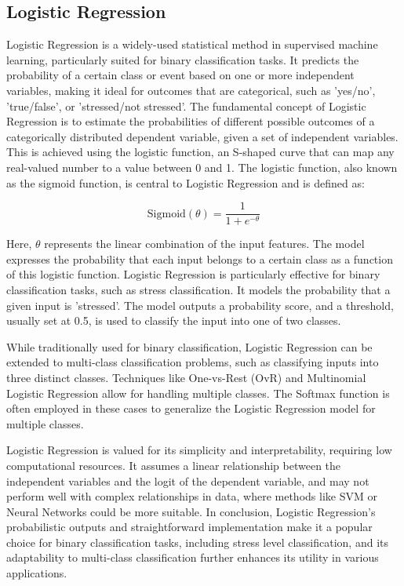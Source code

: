 \subsection*{Logistic Regression}

Logistic Regression is a widely-used statistical method in supervised machine learning, particularly suited for binary classification tasks. It predicts the probability of a certain class or event based on one or more independent variables, making it ideal for outcomes that are categorical, such as 'yes/no', 'true/false', or 'stressed/not stressed'. The fundamental concept of Logistic Regression is to estimate the probabilities of different possible outcomes of a categorically distributed dependent variable, given a set of independent variables. This is achieved using the logistic function, an S-shaped curve that can map any real-valued number to a value between 0 and 1. The logistic function, also known as the sigmoid function, is central to Logistic Regression and is defined as:

\begin{equation}
    \text{Sigmoid}(\theta) = \frac{1}{1 + e^{-\theta}}
\end{equation}

Here, \( \theta \) represents the linear combination of the input features. The model expresses the probability that each input belongs to a certain class as a function of this logistic function. Logistic Regression is particularly effective for binary classification tasks, such as stress classification. It models the probability that a given input is 'stressed'. The model outputs a probability score, and a threshold, usually set at 0.5, is used to classify the input into one of two classes. 

While traditionally used for binary classification, Logistic Regression can be extended to multi-class classification problems, such as classifying inputs into three distinct classes. Techniques like One-vs-Rest (OvR) and Multinomial Logistic Regression allow for handling multiple classes. The Softmax function is often employed in these cases to generalize the Logistic Regression model for multiple classes.

Logistic Regression is valued for its simplicity and interpretability, requiring low computational resources. It assumes a linear relationship between the independent variables and the logit of the dependent variable, and may not perform well with complex relationships in data, where methods like SVM or Neural Networks could be more suitable. In conclusion, Logistic Regression's probabilistic outputs and straightforward implementation make it a popular choice for binary classification tasks, including stress level classification, and its adaptability to multi-class classification further enhances its utility in various applications.

   